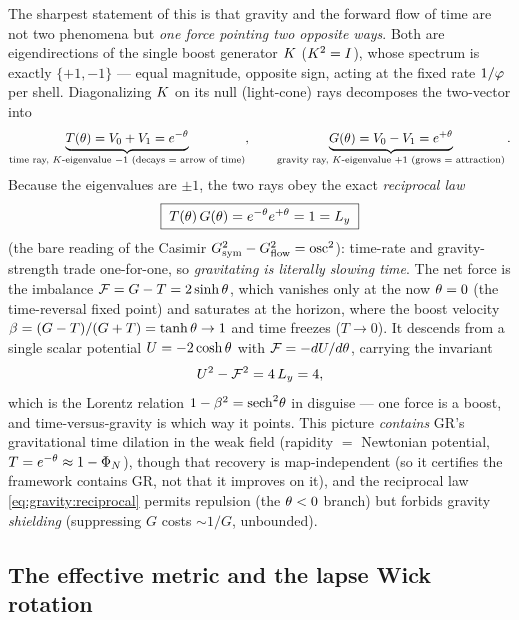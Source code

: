 The sharpest statement of this is that gravity and the forward flow of time are not two phenomena but \emph{one force pointing two opposite ways}. Both are eigendirections of the single boost generator $K$ ($K^2=I$), whose spectrum is exactly $\{+1,-1\}$ — equal magnitude, opposite sign, acting at the fixed rate $1/\varphi$ per shell. Diagonalizing $K$ on its null (light-cone) rays decomposes the two-vector into
\begin{equation}
\underbrace{T(\theta)=V_0+V_1=e^{-\theta}}_{\text{time ray, }K\text{-eigenvalue }-1\text{ (decays = arrow of time)}},
\qquad
\underbrace{G(\theta)=V_0-V_1=e^{+\theta}}_{\text{gravity ray, }K\text{-eigenvalue }+1\text{ (grows = attraction)}}.
\label{eq:gravity:rays}
\end{equation}
Because the eigenvalues are $\pm1$, the two rays obey the exact \emph{reciprocal law}
\begin{equation}
\boxed{\;T(\theta)\,G(\theta)=e^{-\theta}e^{+\theta}=1=L_{y}\;}
\label{eq:gravity:reciprocal}
\end{equation}
(the bare reading of the Casimir $G_{\mathrm{sym}}^2-G_{\mathrm{flow}}^2=\operatorname{osc}^2$): time-rate and gravity-strength trade one-for-one, so \emph{gravitating is literally slowing time}. The net force is the imbalance $\mathcal F=G-T=2\sinh\theta$, which vanishes only at the now $\theta=0$ (the time-reversal fixed point) and saturates at the horizon, where the boost velocity $\beta=(G-T)/(G+T)=\tanh\theta\to1$ and time freezes ($T\to0$). It descends from a single scalar potential $U=-2\cosh\theta$ with $\mathcal F=-dU/d\theta$, carrying the invariant
\begin{equation}
U^2-\mathcal F^2 = 4\,L_{y} = 4,
\label{eq:gravity:Uinvariant}
\end{equation}
which is the Lorentz relation $1-\beta^2=\mathrm{sech}^2\theta$ in disguise — one force is a boost, and time-versus-gravity is which way it points. This picture \emph{contains} GR's gravitational time dilation in the weak field (rapidity $=$ Newtonian potential, $T=e^{-\theta}\approx1-\Phi_N$), though that recovery is map-independent (so it certifies the framework contains GR, not that it improves on it), and the reciprocal law \eqref{eq:gravity:reciprocal} permits repulsion (the $\theta<0$ branch) but forbids gravity \emph{shielding} (suppressing $G$ costs $\sim1/G$, unbounded).

\subsection{The effective metric and the lapse Wick rotation}

